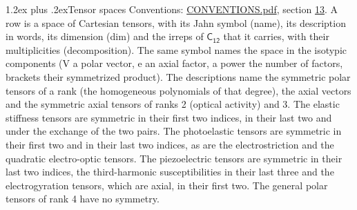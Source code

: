 \documentclass[10pt,a4paper]{article}
\makeatletter
\renewcommand\section{\@startsection{section}{1}{\z@}{-3ex plus -1ex minus -.2ex}%
  {1.2ex plus .2ex}{\normalfont\large\sffamily\bfseries\color{parttitle}}}
\numberwithin{equation}{section}
\newcommand{\grp}[1]{\mathsf{#1}}
\makeatother
\begin{document}
\section{Tensor spaces}\label{s:tensor_spaces}
Conventions: \href{../../CONVENTIONS.pdf}{CONVENTIONS.pdf}, section \href{../../CONVENTIONS.pdf\#conv.13}{13}.
\leavevmode\label{n:head.name}\label{n:head.description}\label{n:head.dim}\label{n:head.decomposition}A row is a space of Cartesian tensors, with its Jahn symbol (name), its description in words, its dimension (dim) and the irreps of $\grp{C_{12}}$ that it carries, with their multiplicities (decomposition). \label{n:label.jahn}The same symbol names the space in the isotypic components (V a polar vector, e an axial factor, a power the number of factors, brackets their symmetrized product). The descriptions name the symmetric polar tensors of a rank (the homogeneous polynomials of that degree), the axial vectors and the symmetric axial tensors of ranks 2 (optical activity) and 3. The elastic stiffness tensors are symmetric in their first two indices, in their last two and under the exchange of the two pairs. The photoelastic tensors are symmetric in their first two and in their last two indices, as are the electrostriction and the quadratic electro-optic tensors. The piezoelectric tensors are symmetric in their last two indices, the third-harmonic susceptibilities in their last three and the electrogyration tensors, which are axial, in their first two. The general polar tensors of rank 4 have no symmetry.
\end{document}
